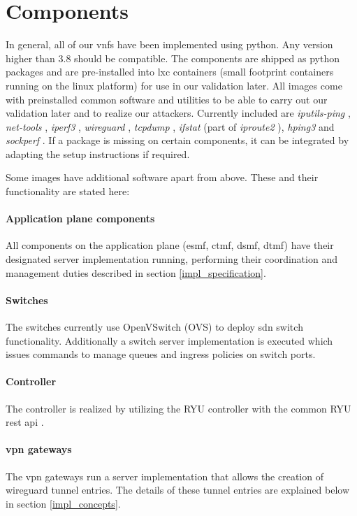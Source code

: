 \newpage

\section{Components}
In general, all of our \acrshort{vnf}s have been implemented using python. Any version higher than 3.8 should be compatible. The components are shipped as python packages and are pre-installed into \acrshort{lxc} containers (small footprint containers running on the linux platform) \cite{lxc} for use in our validation later. All images come with preinstalled common software and utilities to be able to carry out our validation later and to realize our attackers. Currently included are \textit{iputils-ping} \cite{iputils}, \textit{net-tools} \cite{net-tools}, \textit{iperf3} \cite{iperf3}, \textit{wireguard} \cite{wireguard}, \textit{tcpdump} \cite{tcpdump}, \textit{ifstat} (part of \textit{iproute2} \cite{iproute2}), \textit{hping3} \cite{hping3} and \textit{sockperf} \cite{sockperf}. If a package is missing on certain components, it can be integrated by adapting the setup instructions if required.

Some images have additional software apart from above. These and their functionality are stated here:
\paragraph{Application plane components} All components on the application plane (\acrshort{esmf}, \acrshort{ctmf}, \acrshort{dsmf}, \acrshort{dtmf}) have their designated server implementation running, performing their coordination and management duties described in section \ref{impl_specification}.
\paragraph{Switches} The switches currently use OpenVSwitch (OVS) \cite{openvswitch} to deploy \acrshort{sdn} switch functionality. Additionally a switch server implementation is executed which issues commands to manage queues and ingress policies on switch ports.
\paragraph{Controller} The controller is realized by utilizing the RYU controller \cite{ryu} with the common RYU \acrshort{rest} \acrshort{api} \cite{ryu-rest}.
\paragraph{\acrshort{vpn} gateways} The \acrshort{vpn} gateways run a server implementation that allows the creation of wireguard \cite{wireguard} tunnel entries. The details of these tunnel entries are explained below in section \ref{impl_concepts}.

